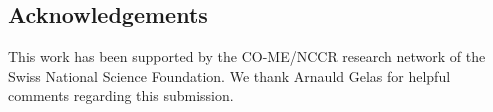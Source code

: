 \documentclass{InsightArticle}
\newcommand{\Statismo}{\emph{Statismo}\xspace}
\begin{document}


\subsection*{Acknowledgements}
This work has been supported by the CO-ME/NCCR research network of
the Swiss National Science Foundation. We thank Arnauld Gelas for helpful comments regarding this
submission. 

%
%






%
%



\end{document}
